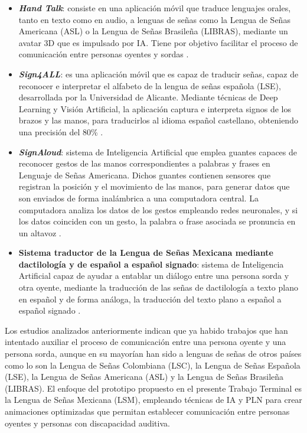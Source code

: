 \begin{itemize}
    \item \textbf{\textit{Hand Talk}}: consiste en una aplicación móvil que traduce lenguajes orales, tanto en texto como en audio, a lenguas de señas como la Lengua de Señas Americana (ASL) o la Lengua de Señas Brasileña (LIBRAS), mediante un avatar 3D que es impulsado por IA. Tiene por objetivo facilitar el proceso de comunicación entre personas oyentes y sordas \cite{ref12}. 
    \item \textbf{\textit{Sign4ALL}}: es una aplicación móvil que es capaz de traducir señas, capaz de reconocer e interpretar el alfabeto de la lengua de señas española (LSE), desarrollada por la Universidad de Alicante. Mediante técnicas de Deep Learning y Visión Artificial, la aplicación captura e interpreta signos de los brazos y las manos, para traducirlos al idioma español castellano, obteniendo una precisión del 80\% \cite{ref13}.
    \item \textbf{\textit{SignAloud}}: sistema de Inteligencia Artificial que emplea guantes capaces de reconocer gestos de las manos correspondientes a palabras y frases en Lenguaje de Señas Americana. Dichos guantes contienen sensores que registran la posición y el movimiento de las manos, para generar datos que son enviados de forma inalámbrica a una computadora central. La computadora analiza los datos de los gestos empleando redes neuronales, y si los datos coinciden con un gesto, la palabra o frase asociada se pronuncia en un altavoz \cite{ref14}.
    \item \textbf{Sistema traductor de la Lengua de Señas Mexicana mediante dactilología y de español a español signado}: sistema de Inteligencia Artificial capaz de ayudar a entablar un diálogo entre una persona sorda y otra oyente, mediante la traducción de las señas de dactilología a texto plano en español y de forma análoga, la traducción del texto plano a español a español signado \cite{ref15}.
\end{itemize}

Los estudios analizados anteriormente indican que ya habido trabajos que han intentado auxiliar el proceso de comunicación entre una persona oyente y una persona sorda, aunque en su mayorían han sido a lenguas de señas de otros países como lo son la Lengua de Señas Colombiana (LSC), la Lengua de Señas Española (LSE), la Lengua de Señas Americana (ASL) y la Lengua de Señas Brasileña (LIBRAS). El enfoque del prototipo propuesto en el presente Trabajo Terminal es la Lengua de Señas Mexicana (LSM), empleando técnicas de IA y PLN para crear animaciones optimizadas que permitan establecer comunicación entre personas oyentes y personas con discapacidad auditiva. \\

